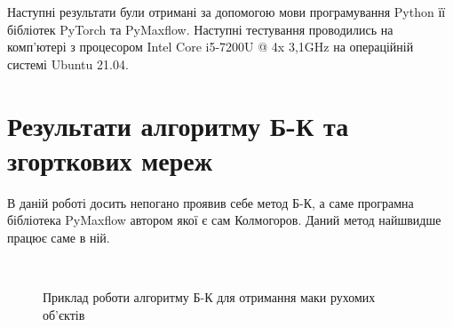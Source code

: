 Наступні результати були отримані за допомогою мови програмування Python
її бібліотек PyTorch та PyMaxflow. Наступні тестування проводились на комп'ютері з
процесором Intel Core i5-7200U @ 4x 3,1GHz на операційній системі Ubuntu 21.04.


\section{Результати алгоритму Б-К та згорткових мереж}

В даній роботі досить непогано проявив себе метод Б-К, а саме програмна бібліотека
PyMaxflow автором якої є сам Колмогоров. Даний метод найшвидше працює саме в ній.


\begin{figure}[H]
    \centering

    \\
    \caption{Приклад роботи алгоритму Б-К для отримання маки рухомих об'єктів
        \label{fig:bk_examples}
    }
\end{figure}


